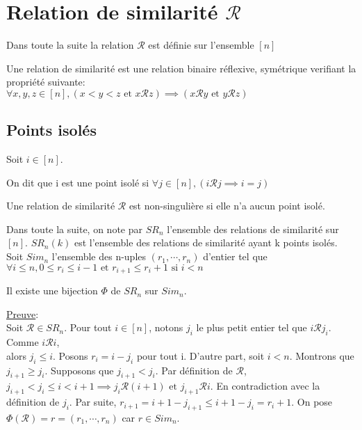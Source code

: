 \chapter{Relation de similarité $\mathcal{R}$}
	Dans toute la suite la relation $\mathcal{R}$ est définie sur l'ensemble $[n]$
	\begin{definition}
		\begin{rm}
			Une relation de similarité est une relation binaire réflexive, symétrique verifiant la propriété suivante:\\
			$\forall x, y, z \in [n], (x<y<z \text{ et } x\mathcal{R}z) \implies (x\mathcal{R}y \text{ et } y\mathcal{R}z) $ 
		\end{rm}
	\end{definition}

	\section{Points isolés}
		Soit $i \in [n]$.	
		\begin{definition}
			\begin{rm}
				On dit que i est une point isolé si $\forall j \in [n], (i\mathcal{R}j\implies i=j) $
			\end{rm}
		\end{definition}
		\begin{definition}
			\begin{rm}
				Une relation de similarité $\mathcal{R}$ est non-singulière si elle n'a aucun point isolé.
			\end{rm}
		\end{definition}
		Dans toute la suite, on note par $ SR_{n} $ l'ensemble des relations de similarité sur $ [n] $. $SR_{n}(k)$ est l'ensemble des relations de similarité ayant k points isolés. 
		Soit $Sim_{n}$ l'ensemble des n-uples $(r_{1},\cdots, r_{n})$ d'entier tel que $\forall i\leq n, 0\leq r_{i} \leq i-1 \text{ et }  r_{i+1}\leq r_{i}+1 \text{ si } i<n $
		\begin{proposition}
			Il existe une bijection $\Phi$ de $SR_{n}$ sur $Sim_{n}$.
		\end{proposition}
		\underline{Preuve}:\\
			Soit $\mathcal{R} \in SR_{n}$. Pour tout $i\in [n]$, notons $j_{i}$ le plus petit entier tel que $i\mathcal{R}j_{i} $. Comme $i\mathcal{R} i $,\\
			alors $j_{i}\leq i$. Posons $r_{i}= i-j_{i} $ pour tout i. D'autre part, soit $ i < n $. Montrons que $j_{i+1}\geq j_{i}$. Supposons que $j_{i+1}<j_{i} $. Par définition de $\mathcal{R}$, $j_{i+1}<j_{i}\leq i <i+1 \implies j_{i}\mathcal{R}(i+1) \text{ et } j_{i+1}\mathcal{R}i $. En contradiction avec la définition de $j_{i}$. Par suite, $r_{i+1}=i+1-j_{i+1}\leq i+1 -j_{i}=r_{i}+1 $. On pose $\Phi(\mathcal{R})=r=(r_{1},\cdots, r_{n}) $ car $r\in Sim_{n}$.\\
